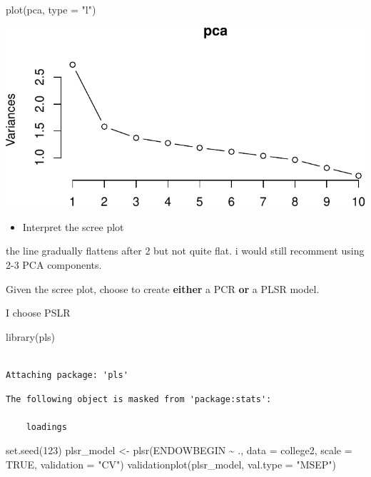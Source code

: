 \documentclass[
  letterpaper,
  DIV=11,
  numbers=noendperiod]{scrartcl}
\newenvironment{Shaded}{\begin{snugshade}}{\end{snugshade}}
\newcommand{\AttributeTok}[1]{\textcolor[rgb]{0.40,0.45,0.13}{#1}}
\newcommand{\ConstantTok}[1]{\textcolor[rgb]{0.56,0.35,0.01}{#1}}
\newcommand{\DecValTok}[1]{\textcolor[rgb]{0.68,0.00,0.00}{#1}}
\newcommand{\FunctionTok}[1]{\textcolor[rgb]{0.28,0.35,0.67}{#1}}
\newcommand{\NormalTok}[1]{\textcolor[rgb]{0.00,0.23,0.31}{#1}}
\newcommand{\OtherTok}[1]{\textcolor[rgb]{0.00,0.23,0.31}{#1}}
\newcommand{\SpecialCharTok}[1]{\textcolor[rgb]{0.37,0.37,0.37}{#1}}
\newcommand{\StringTok}[1]{\textcolor[rgb]{0.13,0.47,0.30}{#1}}
\providecommand{\tightlist}{%
  \setlength{\itemsep}{0pt}\setlength{\parskip}{0pt}}\usepackage{longtable,booktabs,array}
\begin{document}
\begin{Shaded}
\begin{Highlighting}[]
\FunctionTok{plot}\NormalTok{(pca, }\AttributeTok{type =} \StringTok{"l"}\NormalTok{)}
\end{Highlighting}
\end{Shaded}

\includegraphics{Final_627_Tshiani_files/figure-pdf/unnamed-chunk-15-1.pdf}

\begin{itemize}
\tightlist
\item
  Interpret the scree plot
\end{itemize}

the line gradually flattens after 2 but not quite flat. i would still
recomment using 2-3 PCA components.

Given the scree plot, choose to create \textbf{either} a PCR \textbf{or}
a PLSR model.

I choose PSLR

\begin{Shaded}
\begin{Highlighting}[]
\FunctionTok{library}\NormalTok{(pls)}
\end{Highlighting}
\end{Shaded}

\begin{verbatim}

Attaching package: 'pls'
\end{verbatim}

\begin{verbatim}
The following object is masked from 'package:stats':

    loadings
\end{verbatim}

\begin{Shaded}
\begin{Highlighting}[]
\FunctionTok{set.seed}\NormalTok{(}\DecValTok{123}\NormalTok{)}
\NormalTok{plsr\_model }\OtherTok{\textless{}{-}} \FunctionTok{plsr}\NormalTok{(ENDOWBEGIN }\SpecialCharTok{\textasciitilde{}}\NormalTok{ ., }\AttributeTok{data =}\NormalTok{ college2, }\AttributeTok{scale =} \ConstantTok{TRUE}\NormalTok{, }\AttributeTok{validation =} \StringTok{"CV"}\NormalTok{)}
\FunctionTok{validationplot}\NormalTok{(plsr\_model, }\AttributeTok{val.type =} \StringTok{"MSEP"}\NormalTok{)}
\end{Highlighting}
\end{Shaded}
\end{document}
